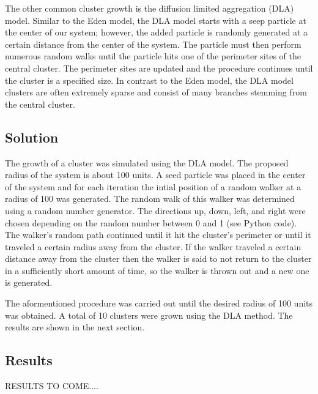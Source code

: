 \documentclass[a4paper,12pt]{article}
\begin{document}
\indent The other common cluster growth is the diffusion limited aggregation (DLA) model.  Similar to the Eden model, the DLA model starts with a seep particle at 
the center of our system; however, the added particle is randomly generated at a certain distance from the center of the system.  The particle must then perform 
numerous random walks until the particle hits one of the perimeter sites of the central cluster.  The perimeter sites are updated and the procedure continues until
the cluster is a specified size.  In contrast to the Eden model, the DLA model clusters are often extremely sparse and consist of many branches stemming from the 
central cluster.

\subsection{Solution}
\indent
\indent The growth of a cluster was simulated using the DLA model.  The proposed radius of the system is about 100 units.  A seed particle was placed in the center of 
the system and for each iteration the intial position of a random walker at a radius of 100 was generated.  The random walk of this walker was determined using a 
random number generator.  The directions up, down, left, and right were chosen depending on the random number between 0 and 1 (see Python code). The walker's random path
continued until it hit the cluster's perimeter or until it traveled a certain radius away from the cluster.  If the walker traveled a certain distance away from the 
cluster then the walker is said to not return to the cluster in a sufficiently short amount of time, so the walker is thrown out and a new one is generated.

\indent The aformentioned procedure was carried out until the desired radius of 100 units was obtained.  A total of 10 clusters were grown using the DLA method.  The
results are shown in the next section.

\subsection{Results}  
\indent RESULTS TO COME....
\end{document}
